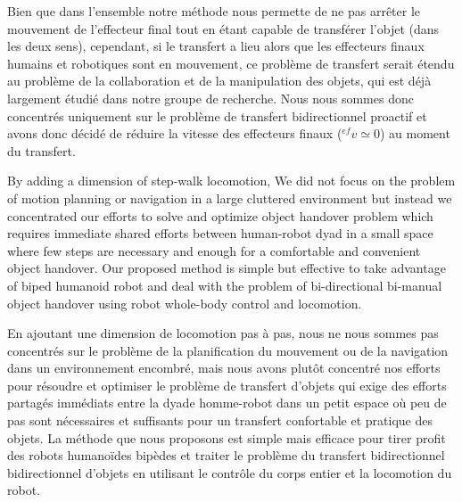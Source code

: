 Bien que dans l'ensemble notre méthode nous permette de ne pas arrêter le mouvement de l'effecteur final tout en étant capable de transférer l'objet (dans les deux sens), cependant, si le transfert a lieu alors que les effecteurs finaux humains et robotiques sont en mouvement, ce problème de transfert serait étendu au problème de la collaboration et de la manipulation des objets, qui est déjà largement étudié dans notre groupe de recherche. Nous nous sommes donc concentrés uniquement sur le problème de transfert bidirectionnel proactif et avons donc décidé de réduire la vitesse des effecteurs finaux (${}^{ef}v\simeq0$)  au moment du transfert. 


By adding a dimension of step-walk locomotion, We did not focus on the problem of motion planning or navigation in a large cluttered environment but instead we concentrated our efforts to solve and optimize object handover problem which requires immediate shared efforts between human-robot dyad in a small space where few steps are necessary and enough for a comfortable and convenient object handover. Our proposed method is simple but effective to take advantage of biped humanoid robot and deal with the problem of bi-directional bi-manual object handover using robot whole-body control and locomotion.

En ajoutant une dimension de locomotion pas à pas, nous ne nous sommes pas concentrés sur le problème de la planification du mouvement ou de la navigation dans un environnement encombré, mais nous avons plutôt concentré nos efforts pour résoudre et optimiser le problème de transfert d'objets qui exige des efforts partagés immédiats entre la dyade homme-robot dans un petit espace où peu de pas sont nécessaires et suffisants pour un transfert confortable et pratique des objets. La méthode que nous proposons est simple mais efficace pour tirer profit des robots humanoïdes bipèdes et traiter le problème du transfert bidirectionnel bidirectionnel d'objets en utilisant le contrôle du corps entier et la locomotion du robot.


\clearpage %
